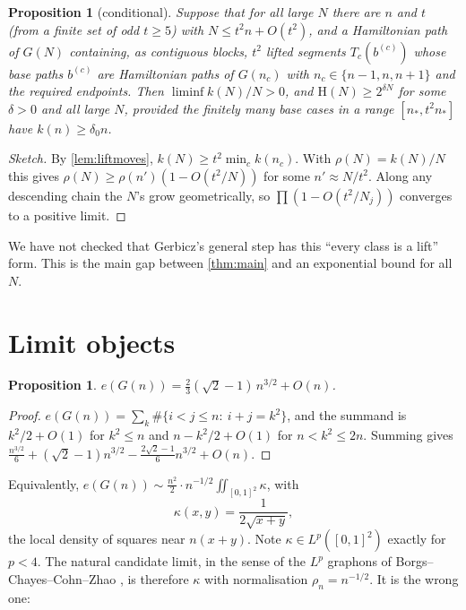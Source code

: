 \documentclass[11pt]{amsart}
\newtheorem{proposition}[theorem]{Proposition}
\theoremstyle{definition}
\newcommand{\Ham}{\mathrm{H}}
\begin{document}
\begin{proposition}[conditional]\label{prop:allN}
Suppose that for all large $N$ there are $n$ and $t$ (from a finite set of odd
$t\ge5$) with $N\le t^2 n+O(t^2)$, and a Hamiltonian path of $G(N)$ containing, as
contiguous blocks, $t^2$ lifted segments $T_c(b^{(c)})$ whose base paths $b^{(c)}$
are Hamiltonian paths of $G(n_c)$ with $n_c\in\{n-1,n,n+1\}$ and the required endpoints.
Then $\liminf k(N)/N>0$, and $\Ham(N)\ge 2^{\delta N}$ for some $\delta>0$ and all
large $N$, provided the finitely many base cases in a range $[n_*,t^2n_*]$ have
$k(n)\ge\delta_0 n$.
\end{proposition}
\begin{proof}[Sketch]
By \cref{lem:liftmoves}, $k(N)\ge t^2\min_c k(n_c)$. With $\rho(N)=k(N)/N$ this gives
$\rho(N)\ge\rho(n')(1-O(t^2/N))$ for some $n'\approx N/t^2$. Along any descending
chain the $N$'s grow geometrically, so $\prod(1-O(t^2/N_j))$ converges to a
positive limit.
\end{proof}
We have not checked that Gerbicz's general step has this ``every class is a lift''
form. This is the main gap between \cref{thm:main} and an exponential bound for all $N$.

\section{Limit objects}\label{sec:limits}

\begin{proposition}\label{prop:edges}
$e(G(n))=\frac23(\sqrt2-1)\,n^{3/2}+O(n)$.
\end{proposition}
\begin{proof}
$e(G(n))=\sum_{k}\#\{i<j\le n:\ i+j=k^2\}$, and the summand is $k^2/2+O(1)$ for
$k^2\le n$ and $n-k^2/2+O(1)$ for $n<k^2\le 2n$. Summing gives
$\frac{n^{3/2}}6+(\sqrt2-1)n^{3/2}-\frac{2\sqrt2-1}6n^{3/2}+O(n)$.
\end{proof}
Equivalently, $e(G(n))\sim\frac{n^{2}}{2}\cdot n^{-1/2}\iint_{[0,1]^2}\kappa$, with
\[
\kappa(x,y)=\frac{1}{2\sqrt{x+y}},
\]
the local density of squares near $n(x+y)$. Note $\kappa\in L^p([0,1]^2)$ exactly for $p<4$.
The natural candidate limit, in the sense of the $L^p$ graphons of
Borgs--Chayes--Cohn--Zhao \cite{BCCZ1,BCCZ2}, is therefore $\kappa$ with
normalisation $\rho_n=n^{-1/2}$. It is the wrong one:
\end{document}
